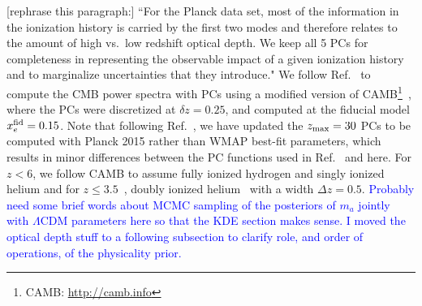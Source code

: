\documentclass[prd,twocolumn,amsmath,amssymb,floatfix,superscriptaddress,nofootinbib]{revtex4-1}
\newcommand{\zmax}{z_{\rm max}}
\newcommand{\wh}[1]{\textcolor{blue}{#1}}
\begin{document}
[rephrase this paragraph:]
``For the Planck data set, most of the information in the ionization history is carried by the
first two modes and therefore relates to the amount of high vs.~low redshift optical depth. We keep all 5 PCs  for completeness in representing the observable
impact of a given ionization history and to marginalize uncertainties that they introduce."
We follow Ref.~\cite{Heinrich:2018btc} to compute the CMB power spectra with PCs using a modified version of CAMB\footnote{CAMB: \url{http://camb.info}}~\cite{Lewis:1999bs, Howlett:2012mh}, where the PCs were discretized at $\delta z = 0.25$, and computed at the fiducial model $x_e^{\rm fid} = 0.15$. Note that following Ref.~\cite{Heinrich:2018btc}, we have updated the $\zmax = 30$ PCs to be computed with Planck 2015 rather than WMAP best-fit parameters, which results in minor differences between the PC functions used in Ref.~\cite{Heinrich:2016ojb} and here. For $z<6$, we follow CAMB to assume fully ionized hydrogen and singly ionized helium and for $z\leq 3.5$~\cite{Becker:2010cu}, doubly ionized helium~\cite{Becker:2010cu} with a width $\Delta z = 0.5$. 
\wh{Probably need some brief words about MCMC sampling of the posteriors of $m_a$ jointly with $\Lambda$CDM parameters here so that the KDE section makes sense.  I moved the optical depth stuff to a following subsection to clarify role, and order of operations, of the physicality prior.}
 
\end{document}

